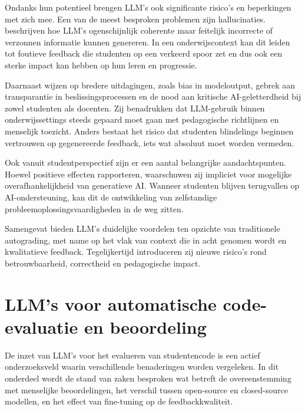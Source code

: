 Ondanks hun potentieel brengen LLM's ook significante risico's en beperkingen met zich mee. Een van de meest besproken problemen zijn hallucinaties. \textcite{Ye2023} beschrijven hoe LLM's ogenschijnlijk coherente maar feitelijk incorrecte of verzonnen informatie kunnen genereren. In een onderwijscontext kan dit leiden tot foutieve feedback die studenten op een verkeerd spoor zet en dus ook een sterke impact kan hebben op hun leren en progressie.

\vspace{1em}

Daarnaast wijzen \textcite{Kasneci2023} op bredere uitdagingen, zoals bias in modeloutput, gebrek aan transparantie in beslissingsprocessen en de nood aan kritische AI-geletterdheid bij zowel studenten als docenten. Zij benadrukken dat LLM-gebruik binnen onderwijssettings steeds gepaard moet gaan met pedagogische richtlijnen en menselijk toezicht. Anders bestaat het risico dat studenten blindelings beginnen vertrouwen op gegenereerde feedback, iets wat absoluut moet worden vermeden.

\vspace{1em}

Ook vanuit studentperspectief zijn er een aantal belangrijke aandachtspunten. Hoewel \textcite{Lepp2025} positieve effecten rapporteren, waarschuwen zij impliciet voor mogelijke overafhankelijkheid van generatieve AI. Wanneer studenten blijven terugvallen op AI-ondersteuning, kan dit de ontwikkeling van zelfstandige probleemoplossingsvaardigheden in de weg zitten.

\vspace{1em}

Samengevat bieden LLM's duidelijke voordelen ten opzichte van traditionele autograding, met name op het vlak van context die in acht genomen wordt en kwalitatieve feedback. Tegelijkertijd introduceren zij nieuwe risico's rond betrouwbaarheid, correctheid en pedagogische impact.


\section{LLM's voor automatische code-evaluatie en beoordeling}
\label{ch:llm-scoring-beoordeling}

De inzet van LLM's voor het evalueren van studentencode is een actief onderzoeksveld waarin verschillende benaderingen worden vergeleken. In dit onderdeel wordt de stand van zaken besproken wat betreft de overeenstemming met menselijke beoordelingen, het verschil tussen open-source en closed-source modellen, en het effect van fine-tuning op de feedbackkwaliteit.

